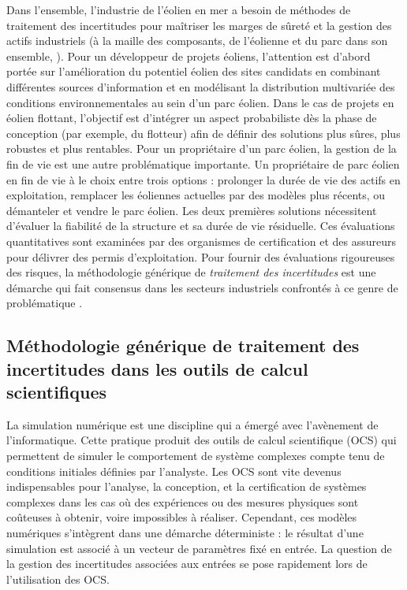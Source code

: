 Dans l'ensemble, l'industrie de l'\'{e}olien en mer a besoin de m\'{e}thodes de traitement des incertitudes pour maîtriser les marges de sûret\'{e} et la gestion des actifs industriels (à la maille des composants, de l'\'{e}olienne et du parc dans son ensemble, \citealp{OWT_review_2016}). 
Pour un d\'{e}veloppeur de projets \'{e}oliens, l'attention est d'abord port\'{e}e sur l'am\'{e}lioration du potentiel \'{e}olien des sites candidats en combinant diff\'{e}rentes sources d'information et en mod\'{e}lisant la distribution multivari\'{e}e des conditions environnementales au sein d'un parc \'{e}olien. 
Dans le cas de projets en \'{e}olien flottant, l'objectif est d'int\'{e}grer un aspect probabiliste dès la phase de conception (par exemple, du flotteur) afin de d\'{e}finir des solutions plus sûres, plus robustes et plus rentables. 
Pour un propri\'{e}taire d'un parc \'{e}olien, la gestion de la fin de vie est une autre probl\'{e}matique importante. 
Un propri\'{e}taire de parc \'{e}olien en fin de vie à le choix entre trois options : prolonger la dur\'{e}e de vie des actifs en exploitation, remplacer les \'{e}oliennes actuelles par des modèles plus r\'{e}cents, ou d\'{e}manteler et vendre le parc \'{e}olien. 
Les deux premières solutions n\'{e}cessitent d'\'{e}valuer la fiabilit\'{e} de la structure et sa dur\'{e}e de vie r\'{e}siduelle. Ces \'{e}valuations quantitatives sont examin\'{e}es par des organismes de certification et des assureurs pour d\'{e}livrer des permis d'exploitation. 
Pour fournir des \'{e}valuations rigoureuses des risques, la m\'{e}thodologie g\'{e}n\'{e}rique de \textit{traitement des incertitudes} est une d\'{e}marche qui fait consensus dans les secteurs industriels confront\'{e}s à ce genre de probl\'{e}matique \citep{rocquigny_2008,blanchard_2023}.


\subsection*{M\'{e}thodologie g\'{e}n\'{e}rique de traitement des incertitudes dans les outils de calcul scientifiques}

La simulation num\'{e}rique est une discipline qui a \'{e}merg\'{e} avec l'avènement de l'informatique. 
Cette pratique produit des outils de calcul scientifique (OCS) qui permettent de simuler le comportement de système complexes compte tenu de conditions initiales d\'{e}finies par l'analyste. 
Les OCS sont vite devenus indispensables pour l'analyse, la conception, et la certification de systèmes complexes dans les cas o\`u des exp\'{e}riences ou des mesures physiques sont coûteuses à obtenir, voire impossibles à r\'{e}aliser. 
Cependant, ces modèles num\'{e}riques s'intègrent dans une d\'{e}marche d\'{e}terministe : le r\'{e}sultat d'une simulation est associ\'{e} à un vecteur de paramètres fix\'{e} en entr\'{e}e. 
La question de la gestion des incertitudes associ\'{e}es aux entr\'{e}es se pose rapidement lors de l'utilisation des OCS. 


